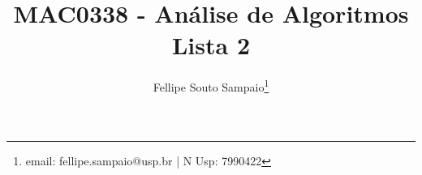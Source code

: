 \title{MAC0338 - Análise de Algoritmos \\ \vspace{10px} \LARGE{Lista 2}}
\author{Fellipe Souto Sampaio\footnote{email: fellipe.sampaio@usp.br | N Usp: 7990422}}
\maketitle

